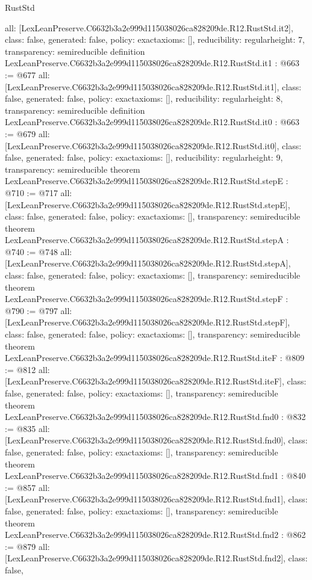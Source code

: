 \begin{lexlean}{RustStd}
\begin{coremodule}
{  all: [LexLeanPreserve.C6632b3a2e999d115038026ca828209de.R12.RustStd.it2],
  class: false,
  generated: false,
  policy: exact{axioms: []},
  reducibility: regular{height: 7},
  transparency: semireducible
}
definition LexLeanPreserve.C6632b3a2e999d115038026ca828209de.R12.RustStd.it1 : @663 := @677 {
  all: [LexLeanPreserve.C6632b3a2e999d115038026ca828209de.R12.RustStd.it1],
  class: false,
  generated: false,
  policy: exact{axioms: []},
  reducibility: regular{height: 8},
  transparency: semireducible
}
definition LexLeanPreserve.C6632b3a2e999d115038026ca828209de.R12.RustStd.it0 : @663 := @679 {
  all: [LexLeanPreserve.C6632b3a2e999d115038026ca828209de.R12.RustStd.it0],
  class: false,
  generated: false,
  policy: exact{axioms: []},
  reducibility: regular{height: 9},
  transparency: semireducible
}
theorem LexLeanPreserve.C6632b3a2e999d115038026ca828209de.R12.RustStd.stepE : @710 := @717 {
  all: [LexLeanPreserve.C6632b3a2e999d115038026ca828209de.R12.RustStd.stepE],
  class: false,
  generated: false,
  policy: exact{axioms: []},
  transparency: semireducible
}
theorem LexLeanPreserve.C6632b3a2e999d115038026ca828209de.R12.RustStd.stepA : @740 := @748 {
  all: [LexLeanPreserve.C6632b3a2e999d115038026ca828209de.R12.RustStd.stepA],
  class: false,
  generated: false,
  policy: exact{axioms: []},
  transparency: semireducible
}
theorem LexLeanPreserve.C6632b3a2e999d115038026ca828209de.R12.RustStd.stepF : @790 := @797 {
  all: [LexLeanPreserve.C6632b3a2e999d115038026ca828209de.R12.RustStd.stepF],
  class: false,
  generated: false,
  policy: exact{axioms: []},
  transparency: semireducible
}
theorem LexLeanPreserve.C6632b3a2e999d115038026ca828209de.R12.RustStd.iteF : @809 := @812 {
  all: [LexLeanPreserve.C6632b3a2e999d115038026ca828209de.R12.RustStd.iteF],
  class: false,
  generated: false,
  policy: exact{axioms: []},
  transparency: semireducible
}
theorem LexLeanPreserve.C6632b3a2e999d115038026ca828209de.R12.RustStd.fnd0 : @832 := @835 {
  all: [LexLeanPreserve.C6632b3a2e999d115038026ca828209de.R12.RustStd.fnd0],
  class: false,
  generated: false,
  policy: exact{axioms: []},
  transparency: semireducible
}
theorem LexLeanPreserve.C6632b3a2e999d115038026ca828209de.R12.RustStd.fnd1 : @840 := @857 {
  all: [LexLeanPreserve.C6632b3a2e999d115038026ca828209de.R12.RustStd.fnd1],
  class: false,
  generated: false,
  policy: exact{axioms: []},
  transparency: semireducible
}
theorem LexLeanPreserve.C6632b3a2e999d115038026ca828209de.R12.RustStd.fnd2 : @862 := @879 {
  all: [LexLeanPreserve.C6632b3a2e999d115038026ca828209de.R12.RustStd.fnd2],
  class: false,
}
\end{coremodule}
\end{lexlean}
